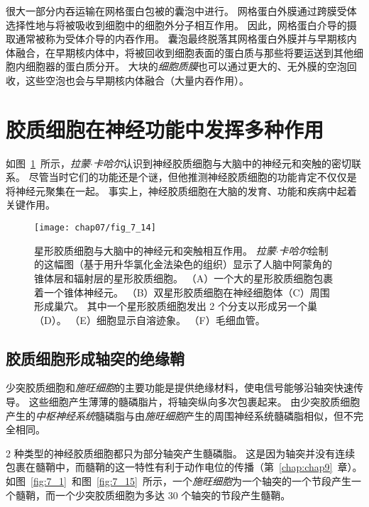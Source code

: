很大一部分内吞运输在网格蛋白包被的囊泡中进行。
网格蛋白外膜通过跨膜受体选择性地与将被吸收到细胞中的细胞外分子相互作用。
因此，网格蛋白介导的摄取通常被称为受体介导的内吞作用。
囊泡最终脱落其网格蛋白外膜并与早期核内体融合，在早期核内体中，将被回收到细胞表面的蛋白质与那些将要运送到其他细胞内细胞器的蛋白质分开。
大块的\textit{细胞质膜}也可以通过更大的、无外膜的空泡回收，这些空泡也会与早期核内体融合（大量内吞作用）。



\section{胶质细胞在神经功能中发挥多种作用}

如图~\ref{fig:7_14}~所示，\textit{拉蒙$\cdot$卡哈尔}认识到神经胶质细胞与大脑中的神经元和突触的密切联系。
尽管当时它们的功能还是个谜，但他推测神经胶质细胞的功能肯定不仅仅是将神经元聚集在一起。
事实上，神经胶质细胞在大脑的发育、功能和疾病中起着关键作用。


\begin{figure}[htbp]
	\centering
	\texttt{[image: chap07/fig\_7\_14]}
	\caption{星形胶质细胞与大脑中的神经元和突触相互作用。
		\textit{拉蒙$\cdot$卡哈尔}绘制的这幅图（基于用升华氯化金法染色的组织）显示了人脑中阿蒙角的锥体层和辐射层的星形胶质细胞。
		（A）一个大的星形胶质细胞包裹着一个锥体神经元。
		（B）双星形胶质细胞在神经细胞体（C）周围形成巢穴。
		其中一个星形胶质细胞发出 2 个分支以形成另一个巢（D）。
		（E）细胞显示自溶迹象。
		（F）毛细血管。 }
	\label{fig:7_14}
\end{figure}



\subsection{胶质细胞形成轴突的绝缘鞘}

少突胶质细胞和\textit{施旺细胞}的主要功能是提供绝缘材料，使电信号能够沿轴突快速传导。
这些细胞产生薄薄的髓磷脂片，将轴突纵向多次包裹起来。
由少突胶质细胞产生的\textit{中枢神经系统}髓磷脂与由\textit{施旺细胞}产生的周围神经系统髓磷脂相似，但不完全相同。


2 种类型的神经胶质细胞都只为部分轴突产生髓磷脂。
这是因为轴突并没有连续包裹在髓鞘中，而髓鞘的这一特性有利于动作电位的传播（第~\ref{chap:chap9}~章）。 
如图~\ref{fig:7_1}~和图~\ref{fig:7_15}~所示，一个\textit{施旺细胞}为一个轴突的一个节段产生一个髓鞘，而一个少突胶质细胞为多达 30 个轴突的节段产生髓鞘。


